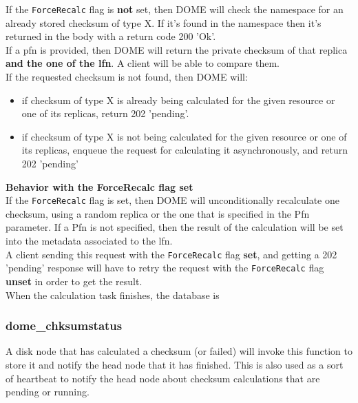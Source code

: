 \documentclass[a4paper,10pt]{scrreprt}
\begin{document}
If the \lstinline"ForceRecalc" flag is \textbf{not} set, then DOME will check
the namespace for an already stored checksum of type X. If it's found in the namespace then it's returned in the body with a return code 200 'Ok'.\\

If a pfn is provided, then DOME will return the private checksum of that replica \textbf{and the one of the lfn}. A client will be able to compare them.\\
 
If the requested checksum is not found, then DOME will:\\
\begin{itemize}
 \item if checksum of type X is already being calculated for the given resource or one of its replicas, return 202 'pending'. 
 \item if checksum of type X is not being calculated for the given resource or one of its replicas, enqueue the request for calculating it asynchronously, and return 202 'pending'
\end{itemize}
 
 
\textbf{Behavior with the ForceRecalc flag set}\\

If the \lstinline"ForceRecalc" flag is set, then DOME will unconditionally recalculate one checksum, using a random replica or the one that is specified in the Pfn parameter.
If a Pfn is not specified, then the result of the calculation will be set into the metadata associated to the lfn.\\
A client sending this request with the  \lstinline"ForceRecalc" flag \textbf{set}, and getting a 202 'pending' response will have to retry the request with the \lstinline"ForceRecalc" flag \textbf{unset} in order to get the result.\\
When the calculation task finishes, the database is 

\subsubsection{dome\_chksumstatus}
A disk node that has calculated a checksum (or failed) will invoke this function to store it and notify the head node that it has finished.
This is also used as a sort of heartbeat to notify the head node about checksum calculations that are pending or running.
\end{document}
